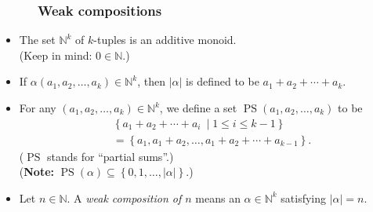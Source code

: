 \documentclass{beamer}
\newcommand{\NN}{{\mathbb N}}
\newcommand{\PS}{\operatorname{PS}}
\newcommand{\fti}[1]{\frametitle{\ \ \ \ \ #1}}
\newcommand{\set}[1]{\left\{ #1 \right\}}
\newcommand{\abs}[1]{\left| #1 \right|}
\newcommand{\tup}[1]{\left( #1 \right)}
\newcommand{\defn}[1]{{\color{darkred}\emph{#1}}} %
\theoremstyle{plain}
\begin{document}
\begin{frame}
\fti{Weak compositions}

\begin{itemize}

\item The set $\NN^k$ of $k$-tuples is an additive monoid. \\
      (Keep in mind: $0 \in \NN$.)

\item If $\alpha \tup{a_1, a_2, \ldots, a_k} \in \NN^k$, then
      \defn{$\abs{\alpha}$} is defined to be
      $a_1 + a_2 + \cdots + a_k$.

\pause

\item For any $\tup{a_1, a_2, \ldots, a_k} \in \NN^k$, we
      define a set
      \defn{$\PS \tup{a_1, a_2, \ldots, a_k}$} to be
      \begin{align*}
      & \set{a_1 + a_2 + \cdots + a_i \ \mid  1 \leq i \leq k-1 } \\
      & = \set{a_1, a_1 + a_2, \ldots, a_1 + a_2 + \cdots + a_{k-1}} .
      \end{align*}
      ($\PS$ stands for ``partial sums''.)
      \pause \\
      (\textbf{Note:}
      $\PS \tup{\alpha}
      \subseteq \set{0, 1, \ldots, \abs{\alpha}}$.)

\pause

\item Let $n \in \NN$.
      A \defn{weak composition of $n$} means an
      $\alpha \in \NN^k$ satisfying $\abs{\alpha} = n$.

\end{itemize}

\end{frame}
\end{document}

